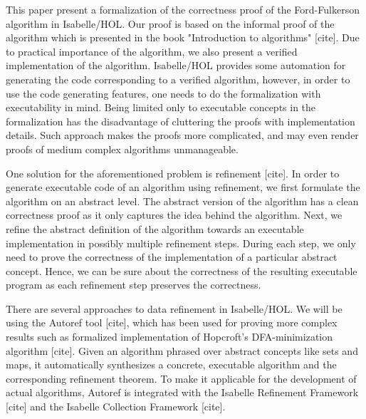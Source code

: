\documentclass{llncs}
\begin{document}
This paper present a formalization of the correctness proof of the Ford-Fulkerson algorithm in Isabelle/HOL. Our proof is based on the informal proof of the algorithm which is presented in the book "Introduction to algorithms" [cite]. Due to practical importance of the algorithm, we also present a verified implementation of the algorithm. Isabelle/HOL provides some automation for generating the code corresponding to a verified algorithm, however, in order to use the code generating features, one needs to do the formalization with executability in mind. Being limited only to executable concepts in the formalization has the disadvantage of cluttering the proofs with implementation details. Such approach makes the proofs more complicated, and may even render proofs of medium complex algorithms unmanageable.

One solution for the aforementioned problem is refinement [cite]. In order to generate executable code of an algorithm using refinement, we first formulate the algorithm on an abstract level. The abstract version of the algorithm has a clean correctness proof as it only captures the idea behind the algorithm. Next, we refine the abstract definition of the algorithm towards an executable implementation in possibly multiple refinement steps. During each step, we only need to prove the correctness of the implementation of a particular abstract concept. Hence, we can be sure about the correctness of the resulting executable program as each refinement step preserves the correctness.

There are several approaches to data refinement in Isabelle/HOL. We will be using the Autoref tool [cite], which has been used for proving more complex results such as formalized implementation of Hopcroft’s DFA-minimization algorithm [cite]. Given an algorithm phrased over abstract concepts like sets and maps, it automatically synthesizes a concrete, executable algorithm and the corresponding refinement theorem. To make it applicable for the development of actual algorithms, Autoref is integrated with the Isabelle Refinement Framework [cite] and the Isabelle Collection Framework [cite].
\end{document}
